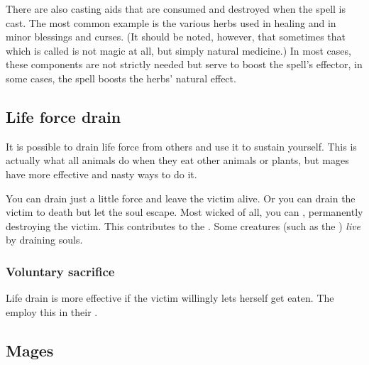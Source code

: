 There are also casting aids that are consumed and destroyed when the spell is cast. The most common example is the various herbs used in healing and in minor blessings and curses. (It should be noted, however, that sometimes that which is called  is not magic at all, but simply natural medicine.) In most cases, these components are not strictly needed but serve to boost the spell's effect\dash{}or, in some cases, the spell boosts the herbs' natural effect. 









\subsection{Life force drain}
It is possible to drain life force from others and use it to sustain yourself. 
This is actually what all animals do when they eat other animals or plants, but mages have more effective and nasty ways to do it. 

You can drain just a little force and leave the victim alive. 
Or you can drain the victim to death but let the soul escape. 
Most wicked of all, you can , permanently destroying the victim. 
This contributes to the . 
Some creatures (such as the ) \emph{live} by draining souls. 





\subsubsection{Voluntary sacrifice}
Life drain is more effective if the victim willingly lets herself get eaten. 
The \resphain{} employ this in their . 









\subsection{Mages}









